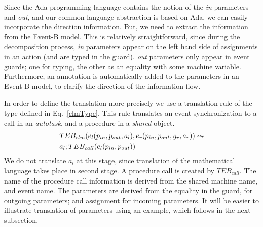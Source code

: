 Since the Ada programming language contains the notion of the \emph{in} parameters and \emph{out}, and our common language abstraction is based on Ada, we can easily incorporate the direction information. But, we need to extract the information from the Event-B model. This is relatively straightforward, since during the decomposition process, \emph{in} parameters appear on the left hand side of assignments in an action (and are typed in the guard). \emph{out} parameters only appear in event guards; one for typing, the other as an equality with some machine variable.  Furthermore, an annotation is automatically added to the parameters in an Event-B model, to clarify the direction of the information flow.

In order to define the translation more precisely we use a translation rule of the type defined in Eq.~\ref{clmType}. This rule translates an event synchronization to a call in an  \emph{autotask}, and a procedure in a \emph{shared} object. 
%
\begin{equation}
\begin{split}
&TEB_{clm}(e_l(p_{in}, p_{out}, a_l), e_r(p_{in}, p_{out}, g_r,a_r)) \leadsto\\
&a_l ; TEB_{call}(e_l(p_{in}, p_{out}))
\notag
\end{split}
\end{equation}
%
We do not translate $a_l$ at this stage, since translation of the mathematical language takes place in second stage. A procedure call is created by $TEB_{call}$. The name of the procedure call information is derived from the shared machine name, and event name. The parameters are derived from the equality in the guard, for outgoing parameters; and assignment for incoming parameters. It will be easier to illustrate translation of parameters using an example, which follows in the next subsection.

